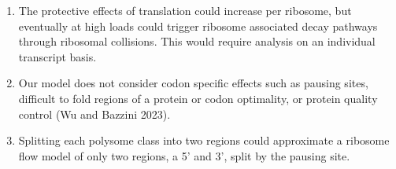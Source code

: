 \documentclass[review]{elsarticle}
\begin{document}
\begin{enumerate}
\begin{enumerate}
  \item The protective effects of translation could increase per ribosome, but eventually at high loads  could trigger ribosome associated decay pathways through ribosomal collisions. This would require analysis on an individual transcript basis.
  \item Our model does not consider codon specific effects such as pausing sites, difficult to fold regions of a protein or codon optimality, or protein quality control (Wu and Bazzini 2023).
  \item Splitting each polysome class into two regions could approximate a ribosome flow model of only two regions, a 5' and 3', split by the pausing site.
  \end{enumerate}
\end{enumerate}
\end{document}
